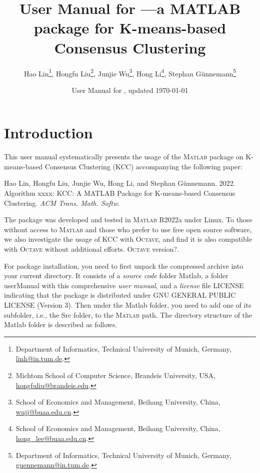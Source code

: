 \documentclass[10pt]{acmtrans2e}
\title{User Manual for \KCC---a {MATLAB} package for K-means-based Consensus Clustering}
\author{
Hao Lin\footnote{Department of Informatics, Technical University of Munich, Germany,
\textsf{\href{mailto:linh@in.tum.de}{linh@in.tum.de}}.}, \quad
Hongfu Liu\footnote{Michtom School of Computer Science, Brandeis University, USA, \textsf{\href{mailto:hongfuliu@brandeis.edu}{hongfuliu@brandeis.edu}}.}, \quad
Junjie Wu\footnote{School of Economics and Management, Beihang University, China, \textsf{\href{mailto:wujj@buaa.edu.cn}{wujj@buaa.edu.cn}}.}, \quad
Hong Li\footnote{School of Economics and Management, Beihang University, China, \textsf{\href{mailto:hong_lee@buaa.edu.cn}{hong\_lee@buaa.edu.cn}}.}, \quad
Stephan Günnemann\footnote{Department of Informatics, Technical University of Munich, Germany, \textsf{\href{mailto:guennemann@in.tum.de}{guennemann@in.tum.de}}.}
}
\date{User Manual for \KCC, updated \today}
\newcommand{\Matlab}{\textsc{Matlab}}
\newcommand{\Octave}{\textsc{Octave}}
\newcommand{\KCC}{\textsf{KCC}\xspace} %
\begin{document}
\maketitle

\vspace*{-0.5cm}

\section{Introduction}

This user manual systematically presents the usage of the \Matlab{} package on K-means-based Consensus Clustering (KCC) accompanying the following paper:
\begin{center}
\begin{minipage}{0.90\textwidth}
Hao Lin, Hongfu Liu, Junjie Wu, Hong Li, and Stephan Günnemann. 2022. Algorithm xxxx: KCC: A MATLAB Package for K-means-based Consensus Clustering. \emph{ACM Trans. Math. Softw}.
\end{minipage}
\end{center}

\noindent The package was developed and tested in \Matlab{} R2022a under Linux. {\color{red}To those without access to \Matlab{} and those who prefer to use free open source software, we also investigate the usage of \KCC with \Octave{}, and find it is also compatible with \Octave{} without additional efforts. \Octave{} version?}. 

For package installation, you need to first unpack the compressed archive into your current directory. It consists of a \emph{source code} folder \textsf{Matlab}, a folder \textsf{userManual} with this comprehensive \emph{user manual}, and a \emph{license} file \textsf{LICENSE} indicating that the package is distributed under GNU GENERAL PUBLIC LICENSE (Version 3). Then under the \textsf{Matlab} folder, you need to add one of its subfolder, i.e., the \textsf{Src} folder, to the \Matlab{} path. The directory structure of the \textsf{Matlab} folder is described as follows.
\end{document}

